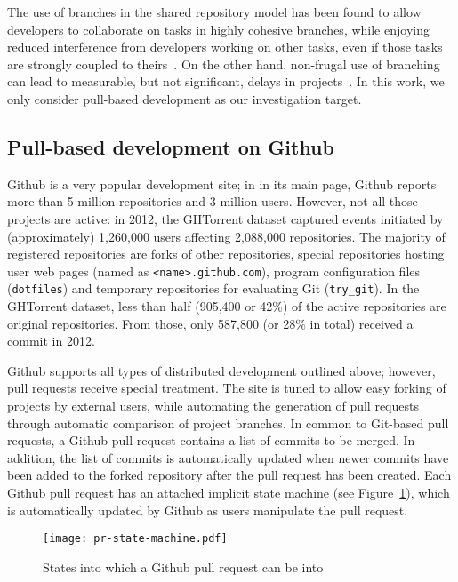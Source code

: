 \documentclass{sig-alternate}
\begin{document}
The use of branches in the shared repository model has been found to allow
developers to collaborate on tasks in highly cohesive branches, while enjoying
reduced interference from developers working on other tasks, even if those tasks
are strongly coupled to theirs~\cite{Barr12}. On the other hand, non-frugal
use of branching can lead to measurable, but not significant, delays in 
projects~\cite{Bird12}. In this work, we only consider pull-based development
as our investigation target.

\subsection{Pull-based development on Github}

Github is a very popular development site; in in its main page, Github reports
more than 5 million repositories and 3 million users. However,  not all those
projects are active: in 2012, the GHTorrent dataset captured events initiated by
(approximately) 1,260,000 users affecting 2,088,000 repositories. The majority
of registered repositories are forks of other repositories, special repositories
hosting user web pages (named as \texttt{<name>.github.com}), program
configuration files (\texttt{dotfiles}) and temporary repositories for
evaluating Git (\texttt{try\_git}). In the GHTorrent dataset, less than half
(905,400 or 42\%) of the active repositories are original repositories. From
those, only 587,800 (or 28\% in total) received a commit in 2012.

Github supports all types of distributed development outlined above; however,
pull requests receive special treatment. The site is tuned to allow easy forking
of projects by external users, while automating the generation of pull
requests through automatic comparison of project branches. In common to
Git-based pull requests, a Github pull request contains a list of commits
to be merged. In addition, the list of commits is automatically updated when newer commits have been added to the forked repository after the pull request
has been created. Each Github pull request has an attached implicit state
machine (see Figure~\ref{fig:state}), which is automatically updated by
Github as users manipulate the pull request.

\begin{figure}
  \begin{center}
    \texttt{[image: pr-state-machine.pdf]}
  \end{center}
  \caption{States into which a Github pull request can be into}
  \label{fig:state}
\end{figure}
\end{document}
